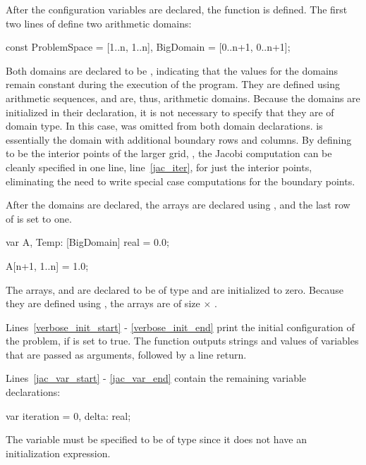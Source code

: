 After the configuration variables are declared, the  function
is defined.  The first two lines of  define two arithmetic domains:
\begin{chapel}
  const ProblemSpace = [1..n, 1..n],
        BigDomain = [0..n+1, 0..n+1];
\end{chapel}
Both domains are declared to be , indicating
that the values for the domains remain constant during the execution of
the program.  They are defined using arithmetic sequences, and are, thus,
arithmetic domains.  Because the domains are initialized in their declaration,
it is not necessary to specify that they are of domain type.  In this case,
 was omitted from both domain declarations.  
 is essentially the  
domain with additional 
boundary rows and columns.  By defining  to be the interior
points of the larger grid, , the Jacobi computation can be cleanly 
specified in one line, line~\ref{jac_iter}, for just the interior points, 
eliminating the need to write special case computations for the boundary points.

After the domains are declared, the arrays are declared using ,
and the last row of  is set to one.
\begin{chapel}
  var A, Temp: [BigDomain] real = 0.0;

  A[n+1, 1..n] = 1.0;
\end{chapel}
The arrays,  and  are declared to be of type  and
are initialized to zero.  Because they are defined using , the
arrays are of size  $\times$ . 

Lines~\ref{verbose_init_start} - \ref{verbose_init_end} print the initial 
configuration of the problem, if 
is set to true.  The  function outputs strings and values
of variables that are passed as arguments, followed by a line return.

Lines~\ref{jac_var_start} - \ref{jac_var_end} 
contain the remaining variable declarations:
\begin{chapel}
  var iteration = 0,
      delta: real;
\end{chapel}
The variable  must be specified to be of type  since
it does not have an initialization expression.

